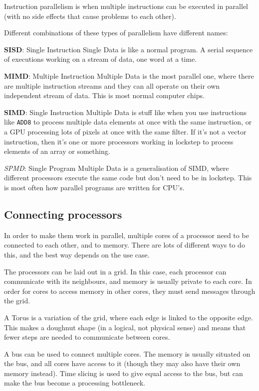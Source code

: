 Instruction parallelism is when multiple instructions can be executed in
parallel (with no side effects that cause problems to each other).

Different combinations of these types of parallelism have different names:

\begin{description}
  \item \textbf{SISD}: Single Instruction Single Data is like a normal program.
  A serial sequence of executions working on a stream of data, one word at a
  time.
  \item \textbf{MIMD}: Multiple Instruction Multiple Data is the most parallel
  one, where there are multiple instruction streams and they can all operate on 
  their own independent stream of data. This is most normal computer chips.
  \item \textbf{SIMD}: Single Instruction Multiple Data is stuff like when you 
  use instructions like \texttt{ADD8} to process multiple data elements at once 
  with the same instruction, or a GPU processing lots of pixels at once with 
  the same filter. If it's not a vector instruction, then it's one or more 
  processors working in lockstep to process elements of an array or something.
  \item \textit{SPMD}: Single Program Multiple Data is a generalisation of SIMD,
  where different processors execute the same code but don't need to be in 
  lockstep. This is most often how parallel programs are written for CPU's.
\end{description}

\subsection{Connecting processors}

In order to make them work in parallel, multiple cores of a processor need to be
connected to each other, and to memory. There are lots of different ways to do
this, and the best way depends on the use case.

\begin{description}
  \item The processors can be laid out in a grid. In this case, each processor
  can communicate with its neighbours, and memory is usually private to each 
  core. In order for cores to access memory in other cores, they must send 
  messages through the grid.
  \item A Torus is a variation of the grid, where each edge is linked to the 
  opposite edge. This makes a doughnut shape (in a logical, not physical sense)
  and means that fewer steps are needed to communicate between cores.
  \item A bus can be used to connect multiple cores. The memory is usually
  situated on the bus, and all cores have access to it (though they may also
  have their own memory instead). Time slicing is used to give equal access to 
  the bus, but can make the bus become a processing bottleneck.
\end{description}

